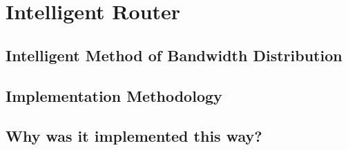 \chapter{Intelligent Router}
\label{chapter4}


\section{Intelligent Method of Bandwidth Distribution}


\section{Implementation Methodology}


\section{Why was it implemented this way?}

